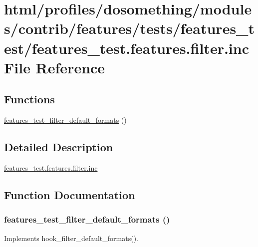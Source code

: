 \hypertarget{features__test_8features_8filter_8inc}{
\section{html/profiles/dosomething/modules/contrib/features/tests/features\_\-test/features\_\-test.features.filter.inc File Reference}
\label{features__test_8features_8filter_8inc}
}
\subsection*{Functions}
\begin{DoxyCompactItemize}
\item 
\hyperlink{features__test_8features_8filter_8inc_a281d24c93eeada406c871be474b7fff4}{features\_\-test\_\-filter\_\-default\_\-formats} ()
\end{DoxyCompactItemize}


\subsection{Detailed Description}
\hyperlink{features__test_8features_8filter_8inc}{features\_\-test.features.filter.inc} 

\subsection{Function Documentation}
\hypertarget{features__test_8features_8filter_8inc_a281d24c93eeada406c871be474b7fff4}{
\subsubsection[{features\_\-test\_\-filter\_\-default\_\-formats}]{\setlength{\rightskip}{0pt plus 5cm}features\_\-test\_\-filter\_\-default\_\-formats ()}}
\label{features__test_8features_8filter_8inc_a281d24c93eeada406c871be474b7fff4}
Implements hook\_\-filter\_\-default\_\-formats(). 